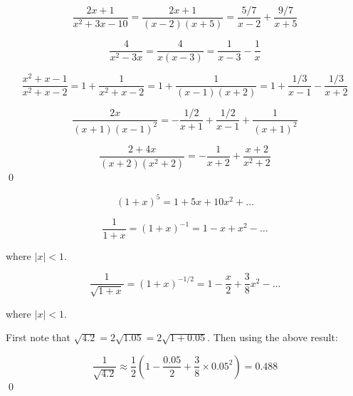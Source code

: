 \documentclass[12pt]{article}
\begin{document}

\begin{equation}
    \frac{2x + 1}{x^{2} + 3x - 10} = \frac{2x + 1}{(x - 2)(x + 5)} = \frac{5/7}{x - 2} + \frac{9/7}{x + 5}
\end{equation}

\begin{equation}
    \frac{4}{x^{2} - 3x} = \frac{4}{x(x - 3)} = \frac{1}{x-3} - \frac{1}{x}
\end{equation}

\begin{equation}
    \frac{x^{2} + x - 1}{x^{2} + x - 2} = 1 + \frac{1}{x^{2} + x - 2} = 1 + \frac{1}{(x - 1)(x + 2)} = 1 + \frac{1/3}{x - 1} - \frac{1/3}{x + 2}
\end{equation}

\begin{equation}
    \frac{2x}{(x + 1)(x - 1)^2} = -\frac{1/2}{x + 1} + \frac{1/2}{x - 1} + \frac{1}{(x + 1)^{2}}
\end{equation}

\begin{equation}
    \frac{2 + 4x}{(x + 2)(x^{2} + 2)} = -\frac{1}{x+2} + \frac{x + 2}{x^{2} + 2}
\end{equation}
\qed



\begin{equation}
    (1 + x)^{5} = 1 + 5x + 10x^{2} + \dots
\end{equation}

\begin{equation}
    \frac{1}{1 + x} = (1 + x)^{-1} = 1 - x + x^{2} - \dots
\end{equation}

where $\lvert x \rvert < 1$.

\begin{equation}
    \frac{1}{\sqrt{1 + x}} = (1 + x)^{-1/2} = 1 - \frac{x}{2} + \frac{3}{8} x^{2} - \dots
\end{equation}

where $\lvert x \rvert < 1$.

First note that $\sqrt{4.2} = 2 \sqrt{1.05} = 2 \sqrt{1 + 0.05}$. Then using the above result:

\begin{equation}
    \frac{1}{\sqrt{4.2}} \approx \frac{1}{2} (1 - \frac{0.05}{2} + \frac{3}{8} \times 0.05^{2}) = \boxed{0.488}
\end{equation}
\qed
\end{document}
